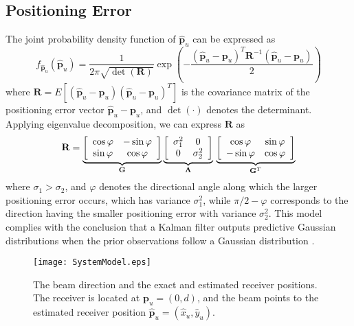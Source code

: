 \documentclass{IEEEtran}
\begin{document}
\subsection{Positioning Error}
The joint probability density function of $\hat{ \textbf{p}}_u $ can be expressed as \cite{PA_beamforming_Access}
\begin{equation}\label{eq-1}
  {f_{\hat{ \textbf{p}}_u}}\left(\hat{ \textbf{p}}_u \right) = \frac{1}{{2\pi \sqrt {\det \left( {\textbf{R}} \right)} }}\exp \left( { - \frac{{{{\left( {\hat{ \textbf{p}}_u - {\textbf{p}}_u} \right)}^T}{{\textbf{R}}^{ - 1}}\left( {\hat{ \textbf{p}}_u - {\textbf{p}}_u} \right)}}{2}} \right)
\end{equation}
where ${\textbf{R}} = E\left[ {\left( {\hat{ \textbf{p}}_u- { \textbf{p}}_u} \right)\left( {\hat{ \textbf{p}}_u- { \textbf{p}}_u} \right)^T} \right]$ is the covariance matrix of the positioning error vector $\hat{ \textbf{p}}_u - { \textbf{p}}_u$, and $\det(\cdot)$ denotes the determinant. Applying eigenvalue decomposition, we can express $\textbf{R}$ as
\begin{equation}\label{eq-2}
{\textbf{R}} = \underbrace {\left[ {\begin{array}{*{20}{c}}
{\cos \varphi }&{ - \sin \varphi }\\
{\sin \varphi }&{\cos \varphi }
\end{array}} \right]}_{\textbf{G}}\underbrace {\left[ {\begin{array}{*{20}{c}}
{\sigma _1^2}&0\\
0&{\sigma _2^2}
\end{array}} \right]}_{\bf{\Lambda }}\\
  \underbrace {\left[ {\begin{array}{*{20}{c}}
{\cos \varphi }&{\sin \varphi }\\
{ - \sin \varphi }&{\cos \varphi }
\end{array}} \right]}_{{{\textbf{G}}^T}}
\end{equation}
where $\sigma_1>\sigma_2$, and $\varphi$ denotes the directional angle along which the larger positioning error occurs, which has variance $\sigma_1^2$, while $\pi/2-\varphi$ corresponds to the direction having the smaller positioning error with variance $\sigma_2^2$. This model complies with the conclusion that a Kalman filter outputs predictive Gaussian distributions when the prior observations follow a Gaussian distribution \cite{anderson1979optimalFiltering}.

\begin{figure}
  \centering
  \texttt{[image: SystemModel.eps]}\\
  \caption{The beam direction and the exact and estimated receiver positions. The receiver is located at $\textbf{p}_u = (0,d)$, and the beam points to the estimated receiver position $\hat{ \textbf{p}}_u = (\hat x_u, \hat y_u)$. }\label{SystemModel}
\end{figure}
\end{document}
